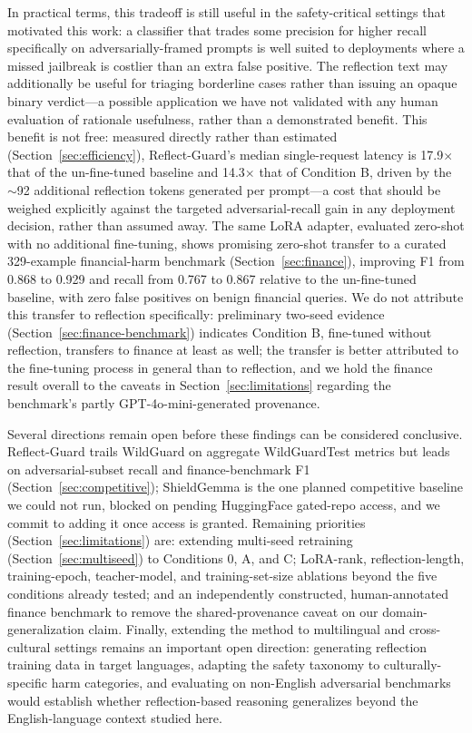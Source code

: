 \documentclass[superintelligence,article,submit,pdftex,moreauthors]{Definitions/mdpi}
\begin{document}
In practical terms, this tradeoff is still useful in the safety-critical settings that motivated this work: a classifier that trades some precision for higher recall specifically on adversarially-framed prompts is well suited to deployments where a missed jailbreak is costlier than an extra false positive. The reflection text may additionally be useful for triaging borderline cases rather than issuing an opaque binary verdict---a possible application we have not validated with any human evaluation of rationale usefulness, rather than a demonstrated benefit. This benefit is not free: measured directly rather than estimated (Section~\ref{sec:efficiency}), Reflect-Guard's median single-request latency is 17.9$\times$ that of the un-fine-tuned baseline and 14.3$\times$ that of Condition B, driven by the $\sim$92 additional reflection tokens generated per prompt---a cost that should be weighed explicitly against the targeted adversarial-recall gain in any deployment decision, rather than assumed away. The same LoRA adapter, evaluated zero-shot with no additional fine-tuning, shows promising zero-shot transfer to a curated 329-example financial-harm benchmark (Section~\ref{sec:finance}), improving F1 from 0.868 to 0.929 and recall from 0.767 to 0.867 relative to the un-fine-tuned baseline, with zero false positives on benign financial queries. We do not attribute this transfer to reflection specifically: preliminary two-seed evidence (Section~\ref{sec:finance-benchmark}) indicates Condition B, fine-tuned without reflection, transfers to finance at least as well; the transfer is better attributed to the fine-tuning process in general than to reflection, and we hold the finance result overall to the caveats in Section~\ref{sec:limitations} regarding the benchmark's partly GPT-4o-mini-generated provenance.

Several directions remain open before these findings can be considered conclusive. Reflect-Guard trails WildGuard on aggregate WildGuardTest metrics but leads on adversarial-subset recall and finance-benchmark F1 (Section~\ref{sec:competitive}); ShieldGemma is the one planned competitive baseline we could not run, blocked on pending HuggingFace gated-repo access, and we commit to adding it once access is granted. Remaining priorities (Section~\ref{sec:limitations}) are: extending multi-seed retraining (Section~\ref{sec:multiseed}) to Conditions 0, A, and C; LoRA-rank, reflection-length, training-epoch, teacher-model, and training-set-size ablations beyond the five conditions already tested; and an independently constructed, human-annotated finance benchmark to remove the shared-provenance caveat on our domain-generalization claim. Finally, extending the method to multilingual and cross-cultural settings remains an important open direction: generating reflection training data in target languages, adapting the safety taxonomy to culturally-specific harm categories, and evaluating on non-English adversarial benchmarks would establish whether reflection-based reasoning generalizes beyond the English-language context studied here.
\end{document}
